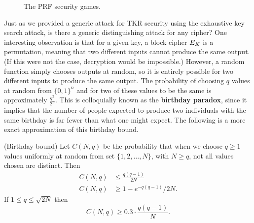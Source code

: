 \begin{figure}[H]
	\centering
\caption{The PRF security games.}
\label{fig:prf}
\end{figure} 

Just as we provided a generic attack for TKR security using the exhaustive key search attack, is there a generic distinguishing attack for any cipher? One interesting observation is that for a given key, a block cipher $E_K$ is a permutation, meaning that two different inputs cannot produce the same output. (If this were not the case, decryption would be impossible.) However, a random function simply chooses outputs at random, so it is entirely possible for two different inputs to produce the same output. The probability of choosing $q$ values at random from $\{0,1\}^n$ and for two of these values to be the same is approximately $\frac{q^2}{2^n}$. This is colloquially known as the \textbf{birthday paradox}, since it implies that the number of people expected to produce two individuals with the same birthday is far fewer than what one might expect. The following is a more exact approximation of this birthday bound. 

\begin{theorem}(Birthday bound)
	\label{thm:bday}
	Let $C(N,q)$ be the probability that when we choose $q\geq 1$ values uniformly at random from set $\{1,2,\ldots,N\}$, with $N \geq q$, not all values chosen are distinct. Then
	\begin{align*}
		C(N,q) &\leq \frac{q(q-1)}{2N} \\
		C(N,q) &\geq 1 - e^{-q(q-1)}/2N.
	\end{align*}
	If $1 \leq q \leq \sqrt{2N}$ then
	\begin{equation*}
		C(N,q) \geq 0.3 \cdot \frac{q(q-1)}{N}.
	\end{equation*}
\end{theorem}

